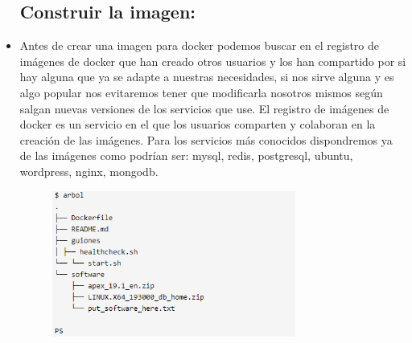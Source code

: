 \begin{itemize}
 \subsection{Construir la imagen:}
	\item Antes de crear una imagen para docker podemos buscar en el registro de imágenes de docker que han creado otros usuarios y los han compartido por si hay alguna que ya se adapte a nuestras necesidades, si nos sirve alguna y es algo popular nos evitaremos tener que modificarla nosotros mismos según salgan nuevas versiones de los servicios que use. El registro de imágenes de docker es un servicio en el que los usuarios comparten y colaboran en la creación de las imágenes. Para los servicios más conocidos dispondremos ya de las imágenes como podrían ser: mysql, redis, postgresql, ubuntu, wordpress, nginx, mongodb.
                     \begin{figure}[H]
		\begin{center}
		\includegraphics[width=8cm]{./Imagenes/100}
		\end{center}
		\end{figure}
	

\end{itemize}







